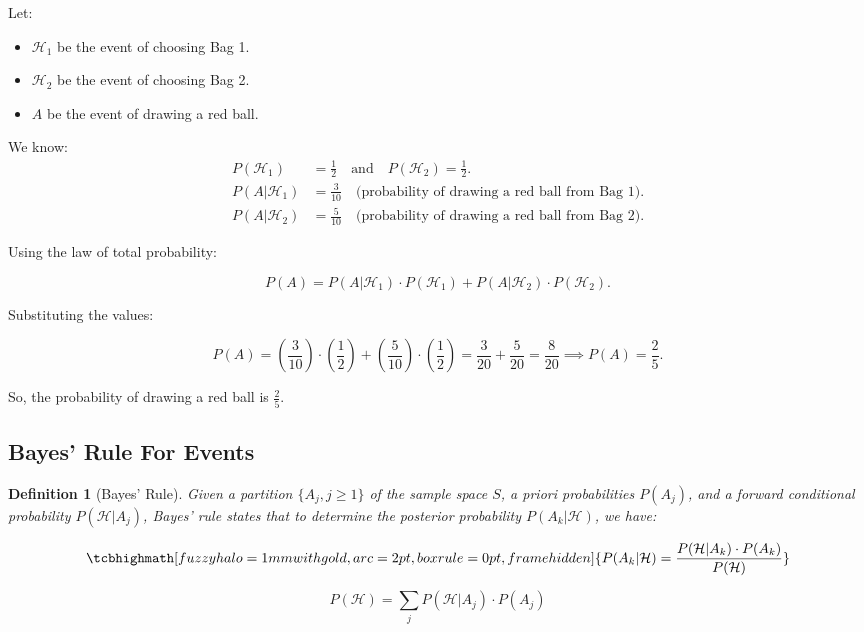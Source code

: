 \documentclass[a4paper,10pt]{article}
\newcommand{\equationgold}[1]{
  \tcbhighmath[fuzzy halo=1mm with gold,arc=2pt,boxrule=0pt,frame hidden]{#1}
}
\newtheorem{definition}{Definition}[section] %
\newcommand{\hlt}[1]{\colorbox{color3}{#1}}
\begin{document}
Let:
\begin{itemize}
    \item $\mathcal{H}_1$ be the event of choosing Bag 1.
    \item $\mathcal{H}_2$ be the event of choosing Bag 2.
    \item $A$ be the event of drawing a red ball.
\end{itemize}

We know:
\begin{align*}
    P(\mathcal{H}_1) &= \frac{1}{2} \quad \text{and} \quad P(\mathcal{H}_2) = \frac{1}{2}. \\
    P(A | \mathcal{H}_1) &= \frac{3}{10} \quad \text{(probability of drawing a red ball from Bag 1)}. \\
    P(A | \mathcal{H}_2) &= \frac{5}{10} \quad \text{(probability of drawing a red ball from Bag 2)}.
\end{align*}

Using the law of total probability:

\[
P(A) = P(A | \mathcal{H}_1) \cdot P(\mathcal{H}_1) + P(A | \mathcal{H}_2) \cdot P(\mathcal{H}_2).
\]

Substituting the values:

\[
P(A) = \left(\frac{3}{10}\right) \cdot \left(\frac{1}{2}\right) + \left(\frac{5}{10}\right) \cdot \left(\frac{1}{2}\right) = \frac{3}{20} + \frac{5}{20} = \frac{8}{20} \implies P(A) = \frac{2}{5}.
\]

So, the probability of drawing a red ball is \( \frac{2}{5} \).

\subsection{Bayes' Rule For Events}

\begin{definition}[Bayes' Rule]
    Given a partition \( \{A_j, j \geq 1\} \) of the sample space \( S \), a \hlt{priori} probabilities \( P(A_j) \), and a forward conditional probability \( P(\mathcal{H} | A_j) \), Bayes' rule states that to determine the \hlt{posterior} probability \( P(A_k | \mathcal{H}) \), we have:

    \begin{equation}
    \equationgold{P(A_k | \mathcal{H}) = \frac{P(\mathcal{H} | A_k) \cdot P(A_k)}{P(\mathcal{H})}}
    \end{equation}
\end{definition}

\begin{equation}
P(\mathcal{H}) = \sum_{j} P(\mathcal{H} | A_j) \cdot P(A_j)
\end{equation}
\end{document}
